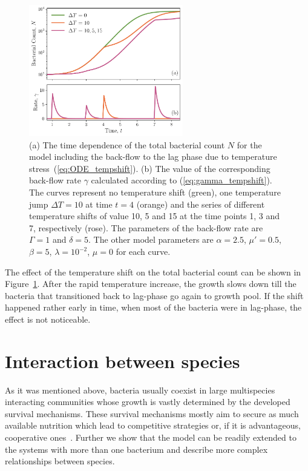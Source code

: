\documentclass[10pt,A4paper]{article}
\begin{document}
\begin{figure}[t]
    \begin{center}
    \includegraphics[width=0.6\textwidth]{Figures/pool_model_3pools_resource_tempshift.pdf}
    \caption{
        (a) The time dependence of the total bacterial count $N$ for the model including the back-flow to the lag phase due to temperature stress~(\ref{eq:ODE_tempshift}).
        (b) The value of the corresponding back-flow rate $\gamma$ calculated according to (\ref{eq:gamma_tempshift}).
        The curves represent no temperature shift (green), one temperature jump $\Delta T = 10$ at time $t=4$ (orange) 
        and the series of different temperature shifts of value 10, 5 and 15 at the time points 1, 3 and 7, respectively (rose).
        The parameters of the back-flow rate are $\Gamma=1$ and $\delta=5$.
        The other model parameters are $\alpha=2.5$, $\mu'=0.5$, $\beta=5$, $\lambda=10^{-2}$, $\mu = 0$ for each curve.
    }
    \label{fig:TempJump}
    \end{center}
\end{figure}
The effect of the temperature shift on the total bacterial count can be shown in Figure~\ref{fig:TempJump}.
After the rapid temperature increase, the growth slows down till the bacteria that transitioned back to lag-phase go again to growth pool.
If the shift happened rather early in time, when most of the bacteria were in lag-phase, the effect is not noticeable.
\newpage
%
%
%
\section{Interaction between species}
As it was mentioned above, bacteria usually coexist in large multispecies interacting communities whose growth is vastly determined by the developed survival mechanisms.
These survival mechanisms mostly aim to secure as much available nutrition which lead to competitive strategies or, if it is advantageous, cooperative ones~\cite{hibbing_bacterial_2010, stubbendieck_bacterial_2016}.
Further we show that the model can be readily extended to the systems with more than one bacterium and describe more complex relationships between species. 
%
%
%
\end{document}
